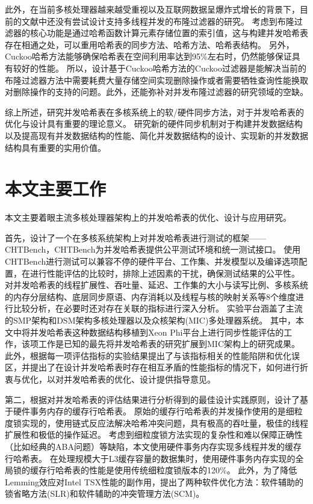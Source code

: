 此外，在当前多核处理器越来越受重视以及互联网数据呈爆炸式增长的背景下，目前的文献中还没有尝试设计支持多线程并发的布隆过滤器的研究。
考虑到布隆过滤器的核心功能是通过哈希函数计算元素存储位置的索引值，这与构建并发哈希表存在相通之处，可以重用哈希表的同步方法、哈希方法、哈希表结构。
另外，Cuckoo哈希方法能够确保哈希表在空间利用率达到95\%左右时，仍然能够保证具有较好的性能。
所以，设计基于Cuckoo哈希方法的Cuckoo过滤器是能解决当前的布隆过滤器方法中需要耗费大量存储空间实现删除操作或者需要牺牲查询性能换取对删除操作的支持的问题。此外，还能弥补对并发布隆过滤器的研究领域的空缺。

综上所述，研究并发哈希表在多核系统上的软/硬件同步方法，对于并发哈希表的优化与设计具有重要的理论意义。
研究新的硬件同步机制对于构建并发数据结构以及提高现有并发数据结构的性能、简化并发数据结构的设计、实现新的并发数据结构具有重要的实用价值。


\section{本文主要工作}
本文主要着眼主流多核处理器架构上的并发哈希表的优化、设计与应用研究。

首先，设计了一个在多核系统架构上对并发哈希表进行测试的框架——CHTBench，CHTBench为并发哈希表提供公平测试环境和统一测试接口。
使用CHTBench进行测试可以兼容不停的硬件平台、工作集、并发模型以及编译选项配置，在进行性能评估的比较时，排除上述因素的干扰，确保测试结果的公平性。
对并发哈希表的线程扩展性、吞吐量、延迟、工作集的大小与读写比例、多核系统的内存分层结构、底层同步原语、内存消耗以及线程与核的映射关系等8个维度进行比较分析，在必要时还对存在关联的指标进行深入分析。
实验平台涵盖了主流的SMP架构和DSM架构多核处理器以及众核架构(MIC)多处理器系统。
其中，本文中将并发哈希表这种数据结构移植到Xeon Phi平台上进行同步性能评估的工作，该项工作是已知的最先将并发哈希表的研究扩展到MIC架构上的研究成果。
此外，根据每一项评估指标的实验结果提出了与该指标相关的性能陷阱和优化误区，并提出了在设计并发哈希表时存在相互矛盾的性能指标的情况下，如何进行折衷与优化，以对并发哈希表的优化、设计提供指导意见。

第二，根据对并发哈希表的评估结果进行分析得到的最佳设计实践原则，设计了基于硬件事务内存的缓存行哈希表。
原始的缓存行哈希表的并发操作使用的是细粒度锁实现的，使用链式反应法解决哈希冲突问题，具有极高的吞吐量，极佳的线程扩展性和极低的操作延迟。
考虑到细粒度锁方法实现的复杂性和难以保障正确性（比如经典的ABA问题）等缺陷，本文使用硬件事务内存实现多线程并发的缓存行哈希表。
在处理规模大于L3缓存容量的数据集时，使用硬件事务内存实现的全局锁的缓存行哈希表的性能是使用传统细粒度锁版本的120\%。
此外，为了降低Lemming效应对Intel TSX性能的副作用，提出了两种软件优化方法：软件辅助的锁省略方法(SLR)和软件辅助的冲突管理方法(SCM)。


